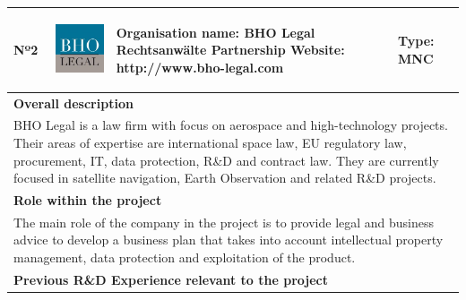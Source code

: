 \begin{longtable}[H]{|p{0.7cm}|p{4cm}|p{7cm}|p{1.3cm}|}
	\hline
	\begin{center} Nº2 \end{center} & \begin{center} \includegraphics[scale=0.4]{./logos/BHO-logo} \end{center} & \begin{center} \textbf{Organisation name:} BHO Legal Rechtsanwälte Partnership \newline \textbf{Website:} http://www.bho-legal.com \end{center} & \begin{center} Type: \newline MNC \end{center} \\ \hline
	
	\multicolumn{4}{|p{13cm}|}{\textbf{Overall description}}  \\ \hline
	
	\multicolumn{4}{|p{14.5cm}|}{BHO Legal is a law firm with focus on aerospace and high-technology projects. Their areas of expertise are international space law, EU regulatory law, procurement, IT, data protection, R\&D and contract law. They are currently focused in satellite navigation, Earth Observation and related R\&D projects.}  \\ \hline
	
	\multicolumn{4}{|p{13cm}|}{\textbf{Role within the project}}   \\ \hline
	
	\multicolumn{4}{|p{14.5cm}|}{The main role of the company in the project is to provide legal and business advice to develop a business plan that takes into account intellectual property management, data protection and exploitation of the product.}  \\ \hline
	
	\multicolumn{4}{|p{13cm}|}{\textbf{Previous R\&D Experience relevant to the project}}  \\ \hline
	

\end{longtable}
